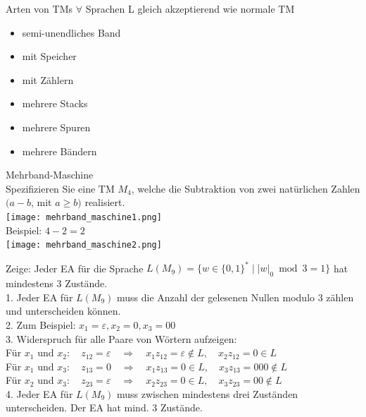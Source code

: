 \begin{concept}{Arten von TMs} $\forall$ Sprachen L gleich akzeptierend wie normale TM

    \vspace{1mm}

    \begin{minipage}{0.45\linewidth}
        \begin{itemize}
            \item semi-unendliches Band
            \item mit Speicher
            \item mit Zählern
        \end{itemize}
    \end{minipage}
    \begin{minipage}{0.45\linewidth}
        \begin{itemize}
            \item mehrere Stacks
            \item mehrere Spuren
            \item mehrere Bändern
        \end{itemize}
    \end{minipage}
\end{concept}



\begin{example2}{Mehrband-Maschine}\\
    Spezifizieren Sie eine TM $M_{4}$, welche die Subtraktion von zwei natürlichen Zahlen $(a-b$, mit $a \geq b)$ realisiert.\\
    \texttt{[image: mehrband\_maschine1.png]}\\
    Beispiel: $4-2=2$\\
    \texttt{[image: mehrband\_maschine2.png]}
\end{example2}

\begin{example} 
Zeige: Jeder EA für die Sprache $L(M_9)=\{w \in\{0,1\}^{*} \mid| w|_{0} \bmod 3=1\}$ hat mindestens 3 Zustände.\\
1. Jeder EA für $L\left(M_9\right)$ muss die Anzahl der gelesenen Nullen modulo 3 zählen und unterscheiden können.\\
2. Zum Beispiel: $x_1=\varepsilon, x_2=0, x_3=00$\\
3. Widerspruch für alle Paare von Wörtern aufzeigen:\\
Für $x_1$ und $x_2: \quad z_{12}=\varepsilon \quad \Rightarrow \quad x_1 z_{12}=\varepsilon \notin L, \quad x_2 z_{12}=0 \in L$\\
Für $x_1$ und $x_3: \quad z_{13}=0 \quad \Rightarrow \quad x_1 z_{13}=0 \in L, \quad x_3 z_{13}=000 \notin L$\\
Für $x_2$ und $x_3: \quad z_{23}=\varepsilon \quad \Rightarrow \quad x_2 z_{23}=0 \in L, \quad x_3 z_{23}=00 \notin L$\\
4. Jeder EA für $L\left(M_9\right)$ muss zwischen mindestens drei Zuständen unterscheiden. Der EA hat mind. 3 Zustände.
\end{example}

